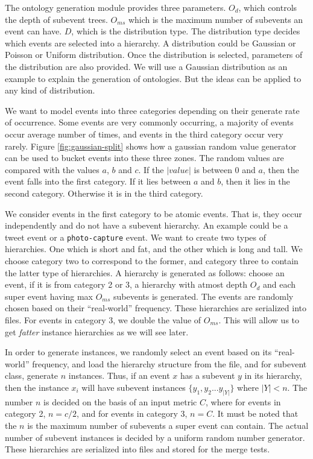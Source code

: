 The ontology generation module provides three parameters. $O_d$, which controls the depth of subevent trees. $O_{ms}$ which is the maximum number of subevents an event can have. $D$, which is the distribution type. The distribution type decides which events are selected into a hierarchy. A distribution could be Gaussian or Poisson or Uniform distribution. Once the distribution is selected, parameters of the distribution are also provided. We will use a Gaussian distribution as an example to explain the generation of ontologies. But the ideas can be applied to any kind of distribution. 

We want to model events into three categories depending on their generate rate of occurrence. Some events are very commonly occurring, a majority of events occur average number of times, and events in the third category occur very rarely. Figure \ref{fig:gaussian-split} shows how a gaussian random value generator can be used to bucket events into these three zones. The random values are compared with the values $a$, $b$ and $c$. If the $|value|$ is between 0 and $a$, then the event falls into the first category. If it lies between $a$ and $b$, then it lies in the second category. Otherwise it is in the third category.

We consider events in the first category to be atomic events. That is, they occur independently and do not have a subevent hierarchy. An example could be a tweet event or a \texttt{photo-capture} event. We want to create two types of hierarchies. One which is short and fat, and the other which is long and tall. We choose category two to correspond to the former, and category three to contain the latter type of hierarchies. A hierarchy is generated as follows: choose an event, if it is from category 2 or 3, a hierarchy with atmost depth $O_d$ and each super event having max $O_{ms}$ subevents is generated. The events are randomly chosen based on their ``real-world'' frequency. These hierarchies are serialized into files. For events in category 3, we double the value of $O_{ms}$. This will allow us to get \textit{fatter} instance hierarchies as we will see later.

In order to generate instances, we randomly select an event based on its ``real-world'' frequency, and load the hierarchy structure from the file, and for subevent class, generate $n$ instances. Thus, if an event $x$ has a subevent $y$ in its hierarchy, then the instance $x_i$ will have subevent instances $\{y_1, y_2 ... y_{|Y|}\}$ where $|Y| < n$. The number $n$ is decided on the basis of an input metric $C$, where for events in category 2, $n = c/2$, and for events in category 3, $n = C$. It must be noted that the $n$ is the maximum number of subevents a super event can contain. The actual number of subevent instances is decided by a uniform random number generator. These hierarchies are serialized into files and stored for the merge tests.

